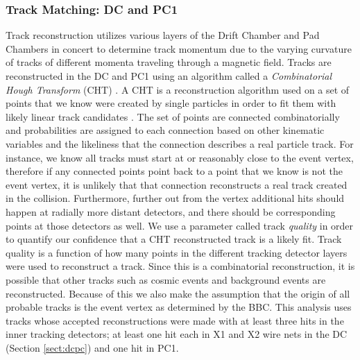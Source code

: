 \subsubsection{Track Matching: DC and PC1}
Track reconstruction utilizes various layers of the Drift Chamber and Pad Chambers in concert to determine track momentum due to the varying curvature of tracks of different momenta traveling through a magnetic field. Tracks are reconstructed in the DC and PC1 using an algorithm called a \textit{Combinatorial Hough Transform} (CHT) \citep{Mitchell:2002wu}. A CHT is a reconstruction algorithm used on a set of points that we know were created by single particles in order to fit them with likely linear track candidates \citep{OHLSSON199277}. The set of points are connected combinatorially and probabilities are assigned to each connection based on other kinematic variables and the likeliness that the connection describes a real particle track. For instance, we know all tracks must start at or reasonably close to the event vertex, therefore if any connected points point back to a point that we know is not the event vertex, it is unlikely that that connection reconstructs a real track created in the collision. Furthermore, further out from the vertex additional hits should happen at radially more distant detectors, and there should be corresponding points at those detectors as well.  We use a parameter called track \textit{quality} in order to quantify our confidence that a CHT reconstructed track is a likely fit. Track quality is a function of how many points in the different tracking detector layers were used to reconstruct a track. Since this is a combinatorial reconstruction, it is possible that other tracks such as cosmic events and background events are reconstructed.  Because of this we also make the assumption that the origin of all probable tracks is the event vertex as determined by the BBC. This analysis uses tracks whose accepted reconstructions were made with at least three hits in the inner tracking detectors; at least one hit each in X1 and X2 wire nets in the DC (Section \ref{sect:dcpc}) and one hit in PC1.
\vspace{2cm}

